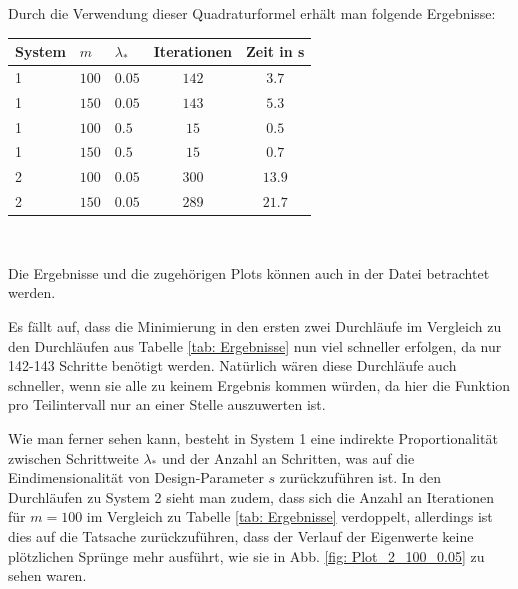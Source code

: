 \documentclass[a4paper,12pt]{report}
\newcommand{\1}{\mathds{1}}
\theoremstyle{plain} %
\theoremstyle{definition} %
\theoremstyle{remark}
\begin{document}
            Durch die Verwendung dieser Quadraturformel erhält man folgende Ergebnisse:

            \begin{table}[!ht]
                  \centering
                  \begin{tabular}{lllcc}
                       System & $m$ & $\lambda_*$ & Iterationen & Zeit in s\\
                       \hline
                       1 & $100$ & $0.05$ & $142$ & $3.7$ \\ 
                       1 & $150$ & $0.05$ & $143$ & $5.3$ \\
                       \hline
                       1 & $100$ & $0.5$ & $15$ & $0.5$ \\
                       1 & $150$ & $0.5$ & $15$ & $0.7$ \\
                       \hline
                       2 & $100$ & $0.05$ & $300$ & $13.9$ \\
                       2 & $150$ & $0.05$ & $289$ & $21.7$ \\
                       \hline
                  \end{tabular}\\
                  \label{tab: Ergebnisse_Mittelpunkt}
            \end{table}

            Die Ergebnisse und die zugehörigen Plots können auch in der Datei\linebreak
            \mbox{\cite[\textit{./Verbesserung\_Mittelpunkt.py}]{github}} betrachtet werden.

            Es fällt auf, dass die Minimierung in den ersten zwei Durchläufe im Vergleich zu den Durchläufen aus Tabelle \ref{tab: Ergebnisse} nun viel schneller erfolgen, da nur 142-143 Schritte benötigt werden.
            Natürlich wären diese Durchläufe auch schneller, wenn sie alle zu keinem Ergebnis kommen würden, da hier die Funktion pro Teilintervall nur an einer Stelle auszuwerten ist.

            Wie man ferner sehen kann, besteht in System 1 eine indirekte Proportionalität zwischen Schrittweite $\lambda_*$ und der Anzahl an Schritten, was auf die Eindimensionalität von Design-Parameter $s$ zurückzuführen ist.
            In den Durchläufen zu System 2 sieht man zudem, dass sich die Anzahl an Iterationen für $m=100$ im Vergleich zu Tabelle \ref{tab: Ergebnisse} verdoppelt,
            allerdings ist dies auf die Tatsache zurückzuführen, dass der Verlauf der Eigenwerte keine plötzlichen Sprünge mehr ausführt, wie sie in Abb. \ref{fig: Plot_2_100_0.05} zu sehen waren.
\end{document}
